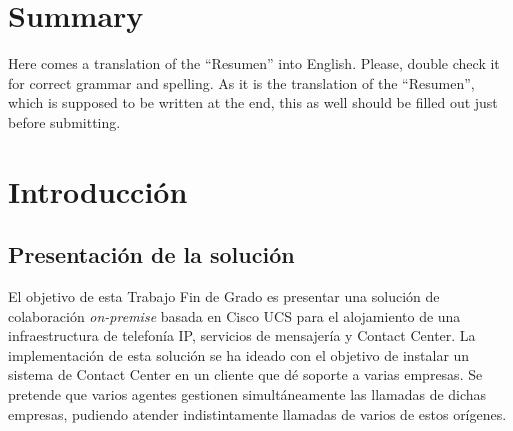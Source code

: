 \documentclass[a4paper, 12pt]{book}
\begin{document}
\chapter*{Summary}

Here comes a translation of the ``Resumen'' into English.
Please, double check it for correct grammar and spelling.
As it is the translation of the ``Resumen'', which is supposed to be written at the end, this as well should be filled out just before submitting.




\tableofcontents
\cleardoublepage
\listoffigures %



\cleardoublepage
\chapter{Introducción}
\label{sec:intro} %

\section{Presentación de la solución}
\label{sec:seccion}

El objetivo de esta Trabajo Fin de Grado es presentar una solución de colaboración \emph{on-premise} basada en Cisco UCS para el alojamiento de una infraestructura de telefonía IP, servicios de mensajería y Contact Center.
La implementación de esta solución se ha ideado con el objetivo de instalar un sistema de Contact Center en un cliente que dé soporte a varias empresas.
Se pretende que varios agentes gestionen simultáneamente las llamadas de dichas empresas, pudiendo atender indistintamente llamadas de varios de estos orígenes.
\end{document}
